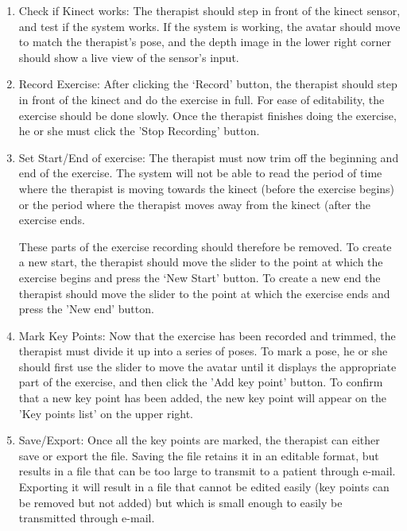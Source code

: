 \documentclass{report}
\begin{document}
\begin{enumerate}
	\item Check if Kinect works: The therapist should step in front of the kinect sensor, and test if the system works. If the system is working, the avatar should move to match the therapist's pose, and the depth image in the lower right corner should show a live view of the sensor's input.

	\item Record Exercise: After clicking the `Record' button, the therapist should step in front of the kinect and do the exercise in full. For ease of editability, the exercise should be done slowly. Once the therapist finishes doing the exercise, he or she must click the 'Stop Recording' button.

	\item Set Start/End of exercise: The therapist must now trim off the beginning and end of the exercise. The system will not be able to read the period of time where the therapist is moving towards the kinect (before the exercise begins) or the period where the therapist moves away from the kinect (after the exercise ends.

		These parts of the exercise recording should therefore be removed. To create a new start, the therapist should move the slider to the point at which the exercise begins and press the `New Start' button. To create a new end the therapist should move the slider to the point at which the exercise ends and press the 'New end' button.

	\item Mark Key Points: Now that the exercise has been recorded and trimmed, the therapist must divide it up into a series of poses. To mark a pose, he or she should first use the slider to move the avatar until it displays the appropriate part of the exercise, and then click the 'Add key point' button. To confirm that a new key point has been added, the new key point will appear on the 'Key points list' on the upper right. 
	
	\item Save/Export: Once all the key points are marked, the therapist can either save or export the file. Saving the file retains it in an editable format, but results in a file that can be too large to transmit to a patient through e-mail. Exporting it will result in a file that cannot be edited easily (key points can be removed but not added) but which is small enough to easily be transmitted through e-mail.
\end{enumerate}
\end{document}
